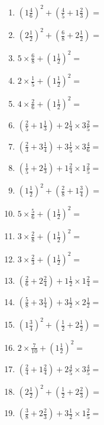 \documentclass[12pt]{article}
\begin{document}
\begin{enumerate}
\item \large $ (1 \frac{4}{6})^2 + (\frac{4}{5} + 1 \frac{2}{3}) = $ \vspace{1.8cm}
\item \large $ (2 \frac{1}{2})^2 + (\frac{6}{8} + 2 \frac{1}{2}) = $ \vspace{1.8cm}
\item \large $ 5 \times \frac{6}{8} + (1 \frac{1}{2})^2 = $ \vspace{1.8cm}
\item \large $ 2 \times \frac{1}{5} + (1 \frac{1}{2})^2 = $ \vspace{1.8cm}
\item \large $ 4 \times \frac{2}{6} + (1 \frac{1}{2})^2 = $ \vspace{1.8cm}
\item \large $ (\frac{2}{5} + 1 \frac{1}{3}) + 2 \frac{1}{4} \times 3 \frac{2}{5} = $ \vspace{1.8cm}
\item \large $ (\frac{2}{3} + 3 \frac{1}{4}) + 3 \frac{1}{5} \times 3 \frac{4}{6} = $ \vspace{1.8cm}
\item \large $ (\frac{1}{5} + 2 \frac{1}{3}) + 1 \frac{2}{4} \times 1 \frac{2}{5} = $ \vspace{1.8cm}
\item \large $ (1 \frac{1}{2})^2 + (\frac{2}{8} + 1 \frac{3}{4}) = $ \vspace{1.8cm}
\newpage
\item \large $ 5 \times \frac{5}{6} + (1 \frac{1}{2})^2 = $ \vspace{1.8cm}
\item \large $ 3 \times \frac{2}{8} + (1 \frac{1}{2})^2 = $ \vspace{1.8cm}
\item \large $ 3 \times \frac{2}{3} + (1 \frac{1}{2})^2 = $ \vspace{1.8cm}
\item \large $ (\frac{2}{6} + 2 \frac{2}{4}) + 1 \frac{1}{2} \times 1 \frac{2}{4} = $ \vspace{1.8cm}
\item \large $ (\frac{5}{8} + 3 \frac{1}{4}) + 3 \frac{1}{2} \times 2 \frac{1}{2} = $ \vspace{1.8cm}
\item \large $ (1 \frac{3}{4})^2 + (\frac{1}{2} + 2 \frac{1}{2}) = $ \vspace{1.8cm}
\item \large $ 2 \times \frac{7}{10} + (1 \frac{1}{2})^2 = $ \vspace{1.8cm}
\item \large $ (\frac{2}{4} + 1 \frac{2}{4}) + 2 \frac{4}{5} \times 3 \frac{4}{5} = $ \vspace{1.8cm}
\item \large $ (2 \frac{1}{2})^2 + (\frac{1}{2} + 2 \frac{2}{3}) = $ \vspace{1.8cm}
\item \large $ (\frac{3}{8} + 2 \frac{2}{3}) + 3 \frac{1}{2} \times 1 \frac{2}{5} = $ \vspace{1.8cm}
\end{enumerate}\newpage
\end{document}
